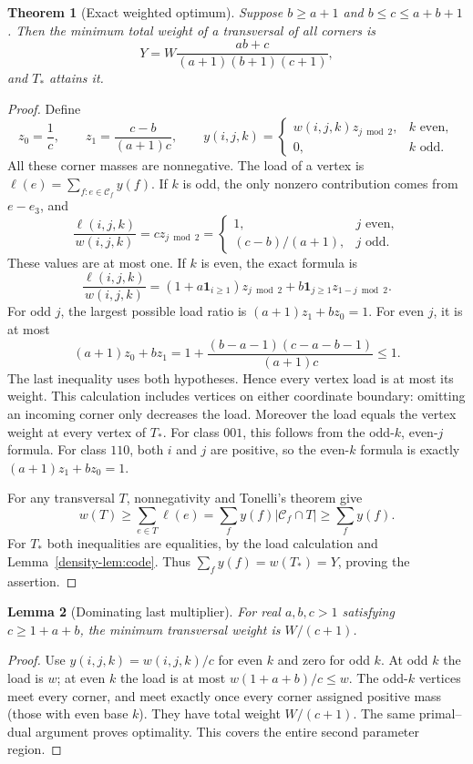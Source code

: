 \documentclass[11pt,a4paper]{article}
\newtheorem{theorem}{Theorem}[section]
\newtheorem{lemma}[theorem]{Lemma}
\theoremstyle{remark}\newtheorem{remark}[theorem]{Remark}
\newcommand{\C}{\mathcal C}
\numberwithin{equation}{section}
\begin{document}
\begin{theorem}[Exact weighted optimum]\label{density-thm:weighted}
Suppose $b\ge a+1$ and $b\le c\le a+b+1$. Then the minimum total weight of a
transversal of all corners is
\[
Y=W\frac{ab+c}{(a+1)(b+1)(c+1)},
\]
and $T_*$ attains it.
\end{theorem}
\begin{proof}
Define
\[
z_0=\frac1c,\qquad z_1=\frac{c-b}{(a+1)c},\qquad
 y(i,j,k)=
 \begin{cases}
 w(i,j,k)z_{j\bmod2},&k\text{ even},\\
 0,&k\text{ odd}.
 \end{cases}
\]
All these corner masses are nonnegative. The load of a vertex is
$\ell(e)=\sum_{f:e\in\C_f}y(f)$. If $k$ is odd, the only nonzero
contribution comes from $e-e_3$, and
\[
 \frac{\ell(i,j,k)}{w(i,j,k)}=c z_{j\bmod2}
 =\begin{cases}1,&j\text{ even},\\(c-b)/(a+1),&j\text{ odd}.
 \end{cases}
\]
These values are at most one. If $k$ is even, the exact formula is
\[
\frac{\ell(i,j,k)}{w(i,j,k)}
=(1+a\mathbf1_{i\ge1})z_{j\bmod2}
+b\mathbf1_{j\ge1}z_{1-j\bmod2}.
\]
For odd $j$, the largest possible load ratio is
$(a+1)z_1+bz_0=1$. For even $j$, it is at most
\[
(a+1)z_0+bz_1
=1+\frac{(b-a-1)(c-a-b-1)}{(a+1)c}\le1.
\]
The last inequality uses both hypotheses. Hence every vertex load
is at most its weight.
This calculation includes vertices on either coordinate boundary:
omitting an incoming corner only decreases the load.
Moreover the load equals the vertex weight at every vertex of $T_*$.
For class $001$, this follows from the odd-$k$, even-$j$ formula.
For class $110$, both $i$ and $j$ are positive, so the even-$k$
formula is exactly $(a+1)z_1+bz_0=1$.

For any transversal $T$, nonnegativity and Tonelli's theorem give
\[
 w(T)\ge\sum_{e\in T}\ell(e)
 =\sum_fy(f)|\C_f\cap T|\ge\sum_fy(f).
\]
For $T_*$ both inequalities are equalities, by the load calculation
and Lemma~\ref{density-lem:code}. Thus
$\sum_fy(f)=w(T_*)=Y$, proving the assertion.
\end{proof}

\begin{lemma}[Dominating last multiplier]\label{density-lem:dominant}
For real $a,b,c>1$ satisfying $c\ge1+a+b$, the minimum transversal
weight is $W/(c+1)$.
\end{lemma}
\begin{proof}
Use $y(i,j,k)=w(i,j,k)/c$ for even $k$ and zero for odd $k$.
At odd $k$ the load is $w$; at even $k$ the load is at most
$w(1+a+b)/c\le w$. The odd-$k$ vertices meet every corner, and
meet exactly once every corner assigned positive mass (those with
even base $k$). They have total weight $W/(c+1)$. The same primal--dual argument
proves optimality. This covers the entire second parameter region.
\end{proof}
\end{document}
